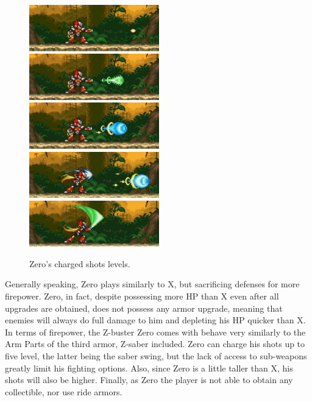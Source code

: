 \begin{figure}[htp]
	\centering
	\includegraphics[height=2cm]{figures/X3/weapons/zero_shot_1.png}
	\includegraphics[height=2cm]{figures/X3/weapons/zero_shot_2.png}
	\centering
	\includegraphics[height=2cm]{figures/X3/weapons/zero_shot_3.png}
	\includegraphics[height=2cm]{figures/X3/weapons/zero_shot_4.png}
	\includegraphics[height=2cm]{figures/X3/weapons/zero_shot_5.png}
	\caption{Zero's charged shots levels.}
\end{figure}

Generally speaking, Zero plays similarly to X, but sacrificing defenses for more firepower. Zero, in fact, despite possessing more HP than X even after all upgrades are obtained, does not possess any armor upgrade, meaning that enemies will always do full damage to him and depleting his HP quicker than X. In terms of firepower, the Z-buster Zero comes with behave very similarly to the Arm Parts of the third armor, Z-saber included. Zero can charge his shots up to five level, the latter being the saber swing, but the lack of access to sub-weapons greatly limit his fighting options. Also, since Zero is a little taller than X, his shots will also be higher. Finally, as Zero the player is not able to obtain any collectible, nor use ride armors.



